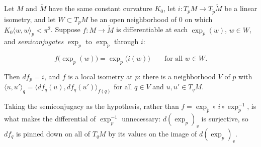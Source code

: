 \begin{lemma}
  \label{lem:dc-ch8-2-2-semiconjugacy}
  \leanok
  Let $M$ and $\tilde M$ have the same constant curvature $K_0$, let $i:T_pM\to T_{\tilde p}\tilde M$
  be a linear isometry, and let $W\subset T_pM$ be an open neighborhood of $0$ on which
  $K_0\langle w,w\rangle_p<\pi^2$. Suppose $f:M\to\tilde M$ is differentiable at each $\exp_p(w)$,
  $w\in W$, and \emph{semiconjugates} $\exp_p$ to $\exp_{\tilde p}$ through $i$:

  $$
  f\big(\exp_p(w)\big)=\exp_{\tilde p}\big(i(w)\big)\qquad\text{for all }w\in W .
  $$

  Then $df_p=i$, and $f$ is a local isometry at $p$: there is a neighborhood $V$ of $p$ with
  $\langle u,u'\rangle_q=\langle df_q(u),df_q(u')\rangle_{f(q)}$ for all $q\in V$ and
  $u,u'\in T_qM$.

  Taking the semiconjugacy as the hypothesis, rather than $f=\exp_{\tilde p}\circ\,i\circ\exp_p^{-1}$,
  is what makes the differential of $\exp_p^{-1}$ unnecessary: $d(\exp_p)_v$ is surjective, so $df_q$
  is pinned down on all of $T_qM$ by its values on the image of $d(\exp_p)_v$.
\end{lemma}
